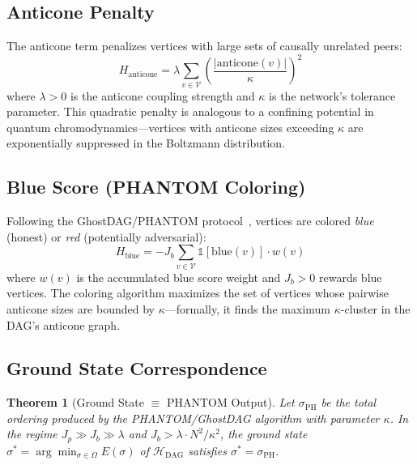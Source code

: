 \documentclass[12pt,a4paper,twocolumn]{article}
\newtheorem{theorem}{Theorem}
\newcommand{\Hdag}{\mathcal{H}_{\mathrm{DAG}}}
\newcommand{\kparam}{\kappa}
\newcommand{\vertexset}{\mathcal{V}}
\begin{document}
\subsection{Anticone Penalty}

The anticone term penalizes vertices with large sets of causally unrelated peers:
\begin{equation}
H_{\mathrm{anticone}} = \lambda \sum_{v \in \vertexset} \left(\frac{|\mathrm{anticone}(v)|}{\kparam}\right)^2
\end{equation}
where $\lambda > 0$ is the anticone coupling strength and $\kparam$ is the network's tolerance parameter. This quadratic penalty is analogous to a confining potential in quantum chromodynamics---vertices with anticone sizes exceeding $\kparam$ are exponentially suppressed in the Boltzmann distribution.

\subsection{Blue Score (PHANTOM Coloring)}

Following the GhostDAG/PHANTOM protocol~\cite{dagknight,kaspa}, vertices are colored \emph{blue} (honest) or \emph{red} (potentially adversarial):
\begin{equation}
H_{\mathrm{blue}} = -J_b \sum_{v \in \vertexset} \mathbb{1}[\text{blue}(v)] \cdot w(v)
\end{equation}
where $w(v)$ is the accumulated blue score weight and $J_b > 0$ rewards blue vertices. The coloring algorithm maximizes the set of vertices whose pairwise anticone sizes are bounded by $\kparam$---formally, it finds the maximum $\kparam$-cluster in the DAG's anticone graph.

\subsection{Ground State Correspondence}

\begin{theorem}[Ground State $\equiv$ PHANTOM Output]
\label{thm:ground_state}
Let $\sigma_{\mathrm{PH}}$ be the total ordering produced by the PHANTOM/GhostDAG algorithm with parameter $\kparam$. In the regime $J_p \gg J_b \gg \lambda$ and $J_b > \lambda \cdot N^2 / \kparam^2$, the ground state $\sigma^* = \arg\min_{\sigma \in \Omega} E(\sigma)$ of $\Hdag$ satisfies $\sigma^* = \sigma_{\mathrm{PH}}$.
\end{theorem}
\end{document}
